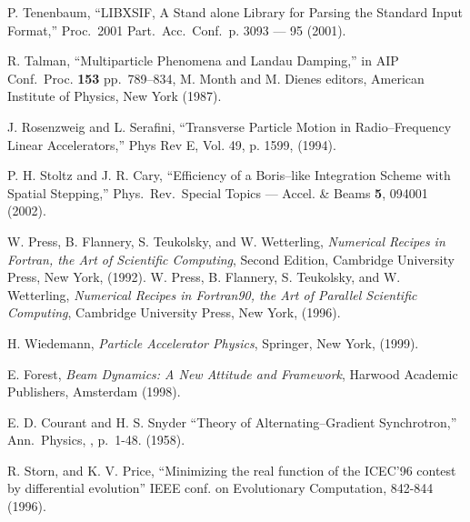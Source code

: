 \begin{thebibliography}{99}
P. Tenenbaum, ``LIBXSIF, A Stand alone Library for Parsing the Standard 
Input Format,'' Proc.\ 2001 Part.\ Acc.\ Conf.\ p. 3093 --- 95 (2001).

R. Talman, ``Multiparticle Phenomena and Landau Damping,'' in AIP Conf.\ Proc.
{\bf 153} pp.~789--834, M. Month and M. Dienes editors, American Institute of
Physics, New York (1987). 

J. Rosenzweig and L. Serafini, ``Transverse Particle Motion in
Radio--Frequency Linear Accelerators,'' Phys Rev E, Vol. 49, p. 1599,
(1994).

P. H. Stoltz and J. R. Cary, ``Efficiency of a Boris--like Integration
Scheme with Spatial Stepping,'' Phys.\ Rev.\ Special Topics ---
Accel. \& Beams {\bf 5}, 094001 (2002).

W. Press, B. Flannery, S. Teukolsky, and W. Wetterling, {\em Numerical
Recipes in Fortran, the Art of Scientific Computing}, Second Edition,
Cambridge University Press, New York, (1992). \hfill \break
W. Press, B. Flannery, S. Teukolsky, and W. Wetterling, {\em Numerical
Recipes in Fortran90, the Art of Parallel Scientific Computing}, 
Cambridge University Press, New York, (1996).

H. Wiedemann, {\em Particle Accelerator Physics}, Springer, New York, (1999). 

E. Forest, {\em Beam Dynamics: A New Attitude and Framework},
Harwood Academic Publishers, Amsterdam (1998).

E. D. Courant and H. S. Snyder ``Theory of Alternating--Gradient Synchrotron,''
Ann.\ Physics, , p.~1-48. (1958).

R. Storn, and K. V. Price, ``Minimizing the real function of the 
ICEC'96 contest by differential evolution'' IEEE conf. on Evolutionary 
Computation, 842-844 (1996).

\end{thebibliography}
